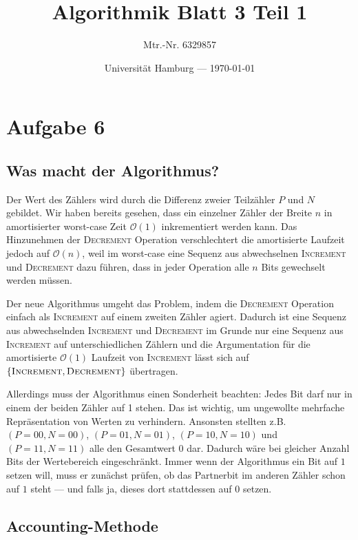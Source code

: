 \documentclass[parskip=half,a4paper]{scrartcl}
\title{Algorithmik Blatt 3 Teil 1}
\author{Mtr.-Nr. 6329857}
\date{Universität Hamburg --- \today}
\begin{document}
\maketitle %

\linenumbers


\section*{Aufgabe 6}

\subsection*{Was macht der Algorithmus?}

Der Wert des Zählers wird durch die Differenz zweier Teilzähler $P$ und $N$ gebildet. Wir haben bereits gesehen, dass ein einzelner Zähler der Breite $n$ in amortisierter worst-case Zeit $\mathcal{O}(1)$ inkrementiert werden kann. Das Hinzunehmen der \textsc{Decrement} Operation verschlechtert die amortisierte Laufzeit jedoch auf $\mathcal{O}(n)$, weil im worst-case eine Sequenz aus abwechselnen \textsc{Increment} und \textsc{Decrement} dazu führen, dass in jeder Operation alle $n$ Bits gewechselt werden müssen.

Der neue Algorithmus umgeht das Problem, indem die \textsc{Decrement} Operation einfach als \textsc{Increment} auf einem zweiten Zähler agiert. Dadurch ist eine Sequenz aus abwechselnden \textsc{Increment} und \textsc{Decrement} im Grunde nur eine Sequenz aus \textsc{Increment} auf unterschiedlichen Zählern und die Argumentation für die amortisierte $\mathcal{O}(1)$ Laufzeit von \textsc{Increment} lässt sich auf $\left\{\textsc{Increment}, \textsc{Decrement}\right\}$ übertragen.

Allerdings muss der Algorithmus einen Sonderheit beachten: Jedes Bit darf nur in einem der beiden Zähler auf 1 stehen. Das ist wichtig, um ungewollte mehrfache Repräsentation von Werten zu verhindern. Ansonsten stellten z.B. $(P=00, N=00)$, $(P=01, N=01)$, $(P=10, N=10)$ und $(P=11, N=11)$ alle den Gesamtwert 0 dar. Dadurch wäre bei gleicher Anzahl Bits der Wertebereich eingeschränkt. Immer wenn der Algorithmus ein Bit auf $1$ setzen will, muss er zunächst prüfen, ob das Partnerbit im anderen Zähler schon auf $1$ steht --- und falls ja, dieses dort stattdessen auf $0$ setzen.

\subsection*{Accounting-Methode}
\end{document}
